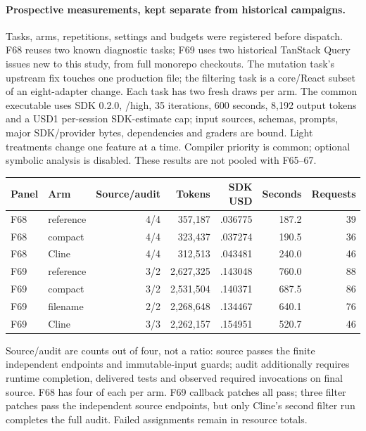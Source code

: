 \documentclass[11pt,a4paper]{article}
\newcommand{\code}[1]{\texttt{\detokenize{#1}}}
\begin{document}
\paragraph{Prospective measurements, kept separate from historical campaigns.}
Tasks, arms, repetitions, settings and budgets were registered before dispatch.
F68 reuses two known diagnostic tasks; F69 uses two historical TanStack Query
issues new to this study, from full monorepo checkouts. The mutation task's upstream
fix touches one production file; the filtering task is a core/React subset of an
eight-adapter change. Each task has two fresh draws per arm. The common executable
uses SDK 0.2.0, \code{gpt-5.6-luna}/high, 35 iterations, 600 seconds, 8,192 output
tokens and a USD1 per-session SDK-estimate cap; input sources, schemas, prompts,
major SDK/provider bytes, dependencies and graders are bound. Light treatments
change one feature at a time. Compiler priority is common; optional symbolic
analysis is disabled. These results are not pooled with F65--67.

\begin{center}\small
\begin{tabular}{llrrrrr}\toprule
Panel & Arm & Source/audit & Tokens & SDK USD & Seconds & Requests \\\midrule
F68 & reference & 4/4 & 357,187 & .036775 & 187.2 & 39 \\
F68 & compact & 4/4 & 323,437 & .037274 & 190.5 & 36 \\
F68 & Cline & 4/4 & 312,513 & .043481 & 240.0 & 46 \\
F69 & reference & 3/2 & 2,627,325 & .143048 & 760.0 & 88 \\
F69 & compact & 3/2 & 2,531,504 & .140371 & 687.5 & 86 \\
F69 & filename & 2/2 & 2,268,648 & .134467 & 640.1 & 76 \\
F69 & Cline & 3/3 & 2,262,157 & .154951 & 520.7 & 46 \\\bottomrule
\end{tabular}
\end{center}
Source/audit are counts out of four, not a ratio: source passes the finite
independent endpoints and immutable-input guards; audit additionally requires
runtime completion, delivered tests and observed required invocations on final
source. F68 has four of each per arm. F69 callback patches all pass; three filter
patches pass the independent source endpoints, but only Cline's second filter
run completes the full audit. Failed assignments remain in resource totals.
\end{document}
